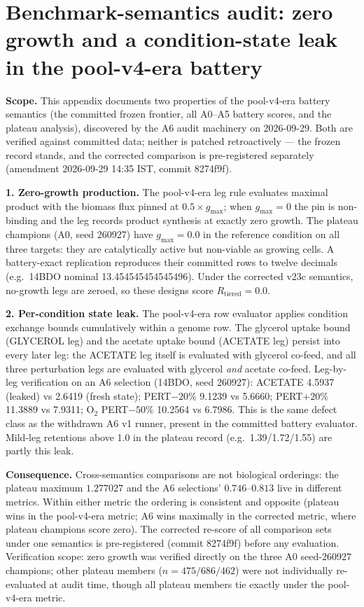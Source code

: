 
\section{Benchmark-semantics audit: zero growth and a condition-state leak in the pool-v4-era battery}
\label{app:semantics}

\textbf{Scope.} This appendix documents two properties of the pool-v4-era battery semantics (the committed frozen frontier, all A0--A5 battery scores, and the plateau analysis), discovered by the A6 audit machinery on 2026-09-29. Both are verified against committed data; neither is patched retroactively --- the frozen record stands, and the corrected comparison is pre-registered separately (amendment 2026-09-29 14:35 IST, commit 8274f9f).

\textbf{1. Zero-growth production.} The pool-v4-era leg rule evaluates maximal product with the biomass flux pinned at $0.5 \times g_{\max}$; when $g_{\max} = 0$ the pin is non-binding and the leg records product synthesis at exactly zero growth. The plateau champions (A0, seed 260927) have $g_{\max} = 0.0$ in the reference condition on all three targets: they are catalytically active but non-viable as growing cells. A battery-exact replication reproduces their committed rows to twelve decimals (e.g.\ 14BDO nominal 13.454545454545496). Under the corrected v23c semantics, no-growth legs are zeroed, so these designs score $R_{\mathrm{tiered}} = 0.0$.

\textbf{2. Per-condition state leak.} The pool-v4-era row evaluator applies condition exchange bounds cumulatively within a genome row. The glycerol uptake bound (GLYCEROL leg) and the acetate uptake bound (ACETATE leg) persist into every later leg: the ACETATE leg itself is evaluated with glycerol co-feed, and all three perturbation legs are evaluated with glycerol \emph{and} acetate co-feed. Leg-by-leg verification on an A6 selection (14BDO, seed 260927): ACETATE 4.5937 (leaked) vs 2.6419 (fresh state); PERT$-20$\% 9.1239 vs 5.6660; PERT$+20$\% 11.3889 vs 7.9311; O$_2$ PERT$-50$\% 10.2564 vs 6.7986. This is the same defect class as the withdrawn A6 v1 runner, present in the committed battery evaluator. Mild-leg retentions above 1.0 in the plateau record (e.g.\ 1.39/1.72/1.55) are partly this leak.

\textbf{Consequence.} Cross-semantics comparisons are not biological orderings: the plateau maximum $1.277027$ and the A6 selections' $0.746$--$0.813$ live in different metrics. Within either metric the ordering is consistent and opposite (plateau wins in the pool-v4-era metric; A6 wins maximally in the corrected metric, where plateau champions score zero). The corrected re-score of all comparison sets under one semantics is pre-registered (commit 8274f9f) before any evaluation. Verification scope: zero growth was verified directly on the three A0 seed-260927 champions; other plateau members ($n = 475/686/462$) were not individually re-evaluated at audit time, though all plateau members tie exactly under the pool-v4-era metric.


